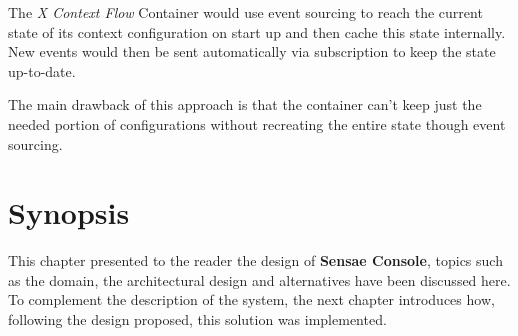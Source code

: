 The \textit{X Context Flow} Container would use event sourcing to reach the current state of its context configuration on start up and then cache this state internally. New events would then be sent automatically via subscription to keep the state up-to-date.

The main drawback of this approach is that the container can't keep just the needed portion of configurations without recreating the entire state though event sourcing.

\section{Synopsis}
\label{sec:design:synopsis}

This chapter presented to the reader the design of \textbf{Sensae Console}, topics such as the domain, the architectural design and alternatives have been discussed here. To complement the description of the system, the next chapter introduces how, following the design proposed, this solution was implemented.
